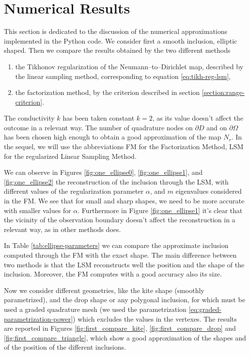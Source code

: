 \documentclass[10pt, a4paper, twoside, openright]{book}
\theoremstyle{definition}
\theoremstyle{plain}
\theoremstyle{plain}
\theoremstyle{plain}
\theoremstyle{plain}
\theoremstyle{plain}
\theoremstyle{plain}
\theoremstyle{plain}
\theoremstyle{plain}
\begin{document}
\section{Numerical Results}
This section is dedicated to the discussion of the numerical approximations 
implemented in the Python code.
We consider first a smooth inclusion, elliptic shaped. Then we compare the results obtained by 
the two different methods
\begin{enumerate}
 \item the Tikhonov regularization of the Neumann--to--Dirichlet map, described by the linear
 sampling method, corresponding to equation \eqref{eq:tikh-reg-lsm},
 \item the factorization method, by the criterion described in section \ref{section:range-criterion}.
\end{enumerate}
The conductivity $k$ has been taken constant $k=2$, as its value doesn't 
affect the outcome in a relevant way. The number of quadrature nodes 
on $\partial D$ and on $\partial \Omega$ has been chosen high enough to obtain a good approximation 
of the map $N_r$.
In the sequel, we will use the abbreviations FM for the Factorization Method, LSM for the regularized 
Linear Sampling Method.
\par
We can observe in Figures 
\ref{fig:one_ellipse0}, \ref{fig:one_ellipse1}, and \ref{fig:one_ellipse2} the 
reconstruction of the inclusion through the LSM, with different values of 
the regularization parameter $\alpha$, and $m$ eigenvalues considered in the FM. We see that for small and sharp shapes, 
we need to be more accurate with smaller values for $\alpha$. Furthermore in Figure \ref{fig:one_ellipse1}
it's clear that the vicinity of the observation boundary doesn't affect the reconstruction in a relevant
way, as in other methods does.
\par
In Table \ref{tab:ellipse-parameters} we can compare the approximate inclusion 
computed through the FM with the exact shape.
The main difference between two methods is that the LSM reconstructs well the position and the shape 
of the inclusion. Moreover, the FM computes with a good accuracy also its size. 



Now we consider different geometries, like the kite shape (smoothly parametrized), 
and the drop shape or any polygonal inclusion, for which must be 
used a graded quadrature mesh 
(we used the parametrization \eqref{eq:graded-parametrization-power}) which excludes the 
values in the vertexes. 
The results are reported in Figures \ref{fig:first_compare_kite}, \ref{fig:first_compare_drop} 
and \ref{fig:first_compare_triangle}, which show a good approximation of the shapes and 
of the position of the different inclusions. 
\end{document}
